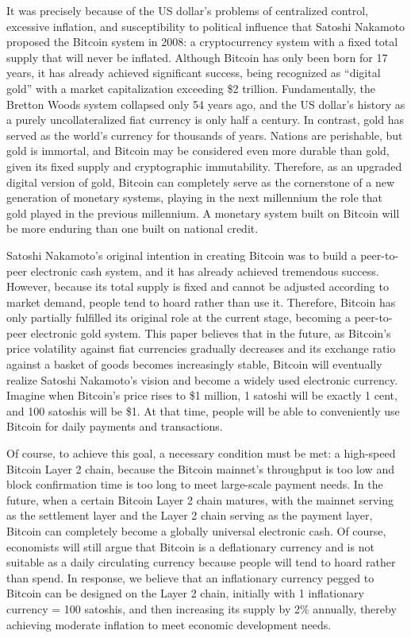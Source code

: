 \documentclass{article}
\begin{document}
It was precisely because of the US dollar's problems of centralized control, excessive inflation, and susceptibility to political influence that Satoshi Nakamoto proposed the Bitcoin system in 2008: a cryptocurrency system with a fixed total supply that will never be inflated\citep{nakamoto2008bitcoin}. Although Bitcoin has only been born for 17 years, it has already achieved significant success, being recognized as ``digital gold'' with a market capitalization exceeding \$2 trillion. Fundamentally, the Bretton Woods system collapsed only 54 years ago, and the US dollar's history as a purely uncollateralized fiat currency is only half a century. In contrast, gold has served as the world's currency for thousands of years. Nations are perishable, but gold is immortal, and Bitcoin may be considered even more durable than gold, given its fixed supply and cryptographic immutability. Therefore, as an upgraded digital version of gold, Bitcoin can completely serve as the cornerstone of a new generation of monetary systems, playing in the next millennium the role that gold played in the previous millennium. A monetary system built on Bitcoin will be more enduring than one built on national credit.

Satoshi Nakamoto's original intention in creating Bitcoin was to build a peer-to-peer electronic cash system, and it has already achieved tremendous success. However, because its total supply is fixed and cannot be adjusted according to market demand, people tend to hoard rather than use it. Therefore, Bitcoin has only partially fulfilled its original role at the current stage, becoming a peer-to-peer electronic gold system. This paper believes that in the future, as Bitcoin's price volatility against fiat currencies gradually decreases and its exchange ratio against a basket of goods becomes increasingly stable, Bitcoin will eventually realize Satoshi Nakamoto's vision and become a widely used electronic currency. Imagine when Bitcoin's price rises to \$1 million, 1 satoshi will be exactly 1 cent, and 100 satoshis will be \$1. At that time, people will be able to conveniently use Bitcoin for daily payments and transactions.

Of course, to achieve this goal, a necessary condition must be met: a high-speed Bitcoin Layer 2 chain, because the Bitcoin mainnet's throughput is too low and block confirmation time is too long to meet large-scale payment needs. In the future, when a certain Bitcoin Layer 2 chain matures, with the mainnet serving as the settlement layer and the Layer 2 chain serving as the payment layer, Bitcoin can completely become a globally universal electronic cash. Of course, economists will still argue that Bitcoin is a deflationary currency and is not suitable as a daily circulating currency because people will tend to hoard rather than spend. In response, we believe that an inflationary currency pegged to Bitcoin can be designed on the Layer 2 chain, initially with 1 inflationary currency = 100 satoshis, and then increasing its supply by 2\% annually, thereby achieving moderate inflation to meet economic development needs.
\end{document}
